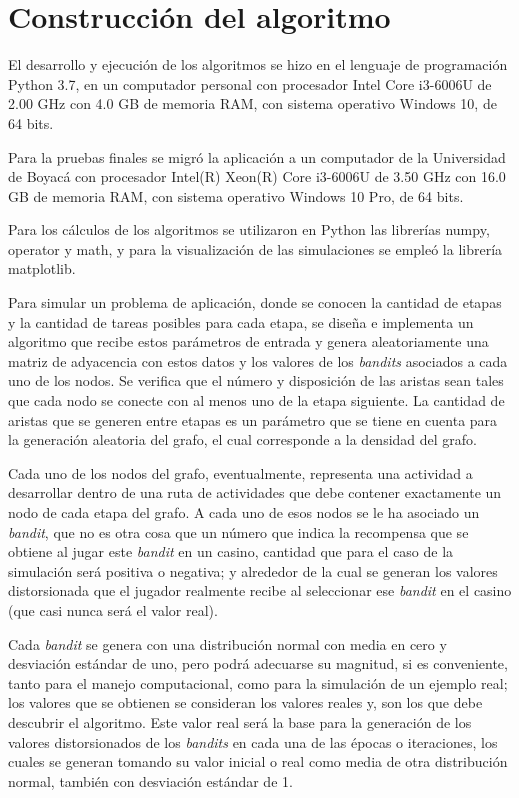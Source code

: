 \section{Construcción del algoritmo}

El desarrollo y ejecución de los algoritmos se hizo en el lenguaje de programación
Python 3.7, en un computador personal con procesador Intel Core i3-6006U de 2.00 GHz con 4.0 GB de memoria RAM, con sistema operativo Windows 10, de 64 bits.

Para la pruebas finales se migró la aplicación a un computador de la Universidad de Boyacá con procesador Intel(R) Xeon(R) Core i3-6006U de 3.50 GHz con 16.0 GB de memoria RAM, con sistema operativo Windows 10 Pro, de 64 bits.

Para los cálculos de los algoritmos se utilizaron en Python las librerías numpy, operator y math, y para la visualización de las simulaciones se empleó la librería matplotlib.

Para simular un problema de aplicación, donde se conocen la cantidad de etapas y la cantidad de tareas posibles para cada etapa, se diseña e implementa un algoritmo que recibe estos parámetros de entrada y genera aleatoriamente una matriz de adyacencia con estos datos y los valores de los \textit{bandits} asociados a cada uno de los nodos. Se verifica que el número y disposición de las aristas sean tales que cada nodo se conecte con al menos uno de la etapa siguiente. 
La cantidad de aristas que se generen entre etapas es un parámetro que se tiene en cuenta para la generación aleatoria del grafo, el cual corresponde a la densidad del grafo.

Cada uno de los nodos del grafo, eventualmente, representa una actividad a desarrollar dentro de una ruta de actividades que debe contener exactamente un nodo de cada etapa del grafo. A cada uno de esos nodos se le ha asociado un \textit{bandit}, que no es otra cosa que un número que indica la recompensa que se obtiene al jugar este \textit{bandit} en un casino, cantidad que para el caso de la simulación será positiva o negativa; y alrededor de la cual se generan los valores distorsionada que el jugador realmente recibe al seleccionar ese \textit{bandit} en el casino (que casi nunca será el valor real).

Cada \textit{bandit} se genera con una distribución normal con media en cero y desviación estándar de uno, pero podrá adecuarse su magnitud, si es conveniente, tanto para el manejo computacional, como para la simulación de un ejemplo real; los valores que se obtienen se consideran los valores reales y, son los que debe descubrir el algoritmo. Este valor real será la base para la generación de los valores distorsionados de los \textit{bandits} en cada una de las épocas o iteraciones, los cuales se generan tomando su valor inicial o real como media de otra distribución normal, también con desviación estándar de 1.

